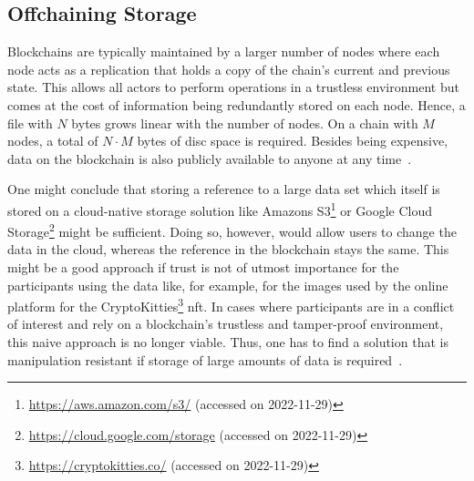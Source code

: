 \subsection{Offchaining Storage}
\label{sec:background:on_vs_off_chain:offchaining_storage}
Blockchains are typically maintained by a larger number of nodes where each node acts as a replication that holds a copy of the chain's current and previous state. This allows all actors to perform operations in a trustless environment but comes at the cost of information being redundantly stored on each node. Hence, a file with $N$ bytes grows linear with the number of nodes. On a chain with $M$ nodes, a total of $N \cdot M$ bytes of disc space is required. Besides being expensive, data on the blockchain is also publicly available to anyone at any time~\cite{nakamoto2009,buterin2020}.

One might conclude that storing a reference to a large data set which itself is stored on a cloud-native storage solution like Amazons S3\footnote{\url{https://aws.amazon.com/s3/} (accessed on 2022-11-29)} or Google Cloud Storage\footnote{\url{https://cloud.google.com/storage} (accessed on 2022-11-29)} might be sufficient. Doing so, however, would allow users to change the data in the cloud, whereas the reference in the blockchain stays the same. This might be a good approach if trust is not of utmost importance for the participants using the data like, for example, for the images used by the online platform for the CryptoKitties\footnote{\url{https://cryptokitties.co/} (accessed on 2022-11-29)} \gls{nft}. In cases where participants are in a conflict of interest and rely on a blockchain's trustless and tamper-proof environment, this naive approach is no longer viable. Thus, one has to find a solution that is manipulation resistant if storage of large amounts of data is required~\cite{how_much_blockchain_do_you_need,eberhardt17off_block,weber2019_architecture_for_dapps_blockchain_patterns}.

